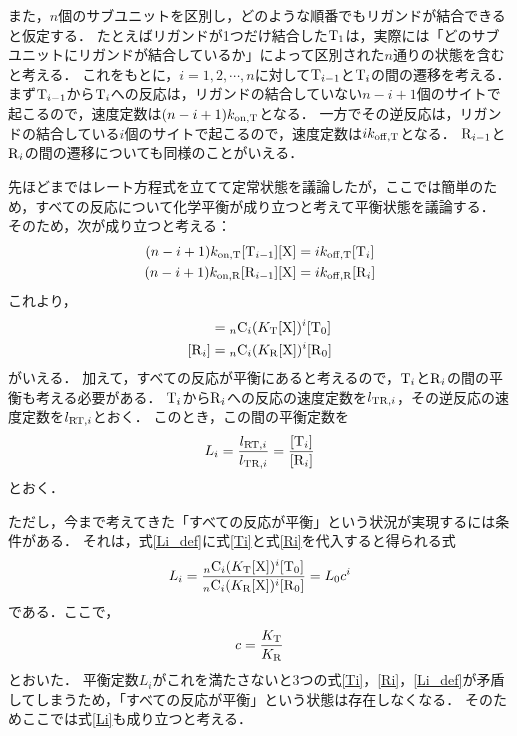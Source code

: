 また，$n$個のサブユニットを区別し，どのような順番でもリガンドが結合できると仮定する．
たとえばリガンドが1つだけ結合した$\ce{T1}$は，実際には「どのサブユニットにリガンドが結合しているか」によって区別された$n$通りの状態を含むと考える．
これをもとに，$i=1,2,\cdots,n$に対して$\ce{T_$i-1$}$と$\ce{T_$i$}$の間の遷移を考える．
まず$\ce{T_$i-1$}$から$\ce{T_$i$}$への反応は，リガンドの結合していない$n-i+1$個のサイトで起こるので，速度定数は$(n-i+1)k_{\mathrm{on},\ce{T}}$となる．
一方でその逆反応は，リガンドの結合している$i$個のサイトで起こるので，速度定数は$ik_{\mathrm{off},\ce{T}}$となる．
$\ce{R_$i-1$}$と$\ce{R_$i$}$の間の遷移についても同様のことがいえる．

先ほどまではレート方程式を立てて定常状態を議論したが，ここでは簡単のため，すべての反応について化学平衡が成り立つと考えて平衡状態を議論する．
そのため，次が成り立つと考える：
\begin{align}
  (n-i+1)k_{\mathrm{on},\ce{T}}[\ce{T_$i-1$}][\ce{X}] &= ik_{\mathrm{off},\ce{T}}[\ce{T_$i$}] \\
  (n-i+1)k_{\mathrm{on},\ce{R}}[\ce{R_$i-1$}][\ce{X}] &= ik_{\mathrm{off},\ce{R}}[\ce{R_$i$}]
\end{align}
これより，
\begin{align}
  [\ce{T_$i$}] &= {}_n \mathrm{C}_i (K_{\ce{T}}[\ce{X}])^i [\ce{T0}] \label{Ti}\\
  [\ce{R_$i$}] &= {}_n \mathrm{C}_i (K_{\ce{R}}[\ce{X}])^i [\ce{R0}] \label{Ri}
\end{align}
がいえる．
加えて，すべての反応が平衡にあると考えるので，$\ce{T_$i$}$と$\ce{R_$i$}$の間の平衡も考える必要がある．
$\ce{T_$i$}$から$\ce{R_$i$}$への反応の速度定数を$l_{\ce{TR},i}$，その逆反応の速度定数を$l_{\ce{RT},i}$とおく．
このとき，この間の平衡定数を
\begin{equation}
  L_{i} = \frac{l_{\ce{RT},i}}{l_{\ce{TR},i}} = \frac{[\ce{T_$i$}]}{[\ce{R_$i$}]} \label{Li_def}
\end{equation}
とおく．

ただし，今まで考えてきた「すべての反応が平衡」という状況が実現するには条件がある．
それは，式\eqref{Li_def}に式\eqref{Ti}と式\eqref{Ri}を代入すると得られる式
\begin{equation}
  L_{i} = \frac{{}_n \mathrm{C}_i (K_{\ce{T}}[\ce{X}])^i [\ce{T0}]}{{}_n \mathrm{C}_i (K_{\ce{R}}[\ce{X}])^i [\ce{R0}]} = L_0 c^i \label{Li}
\end{equation}
である．ここで，
\begin{equation}
  c = \frac{K_{\ce{T}}}{K_{\ce{R}}}
\end{equation}
とおいた．
平衡定数$L_i$がこれを満たさないと3つの式\eqref{Ti}，\eqref{Ri}，\eqref{Li_def}が矛盾してしまうため，「すべての反応が平衡」という状態は存在しなくなる．
そのためここでは式\eqref{Li}も成り立つと考える．

